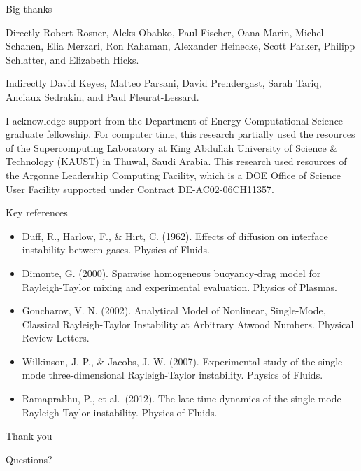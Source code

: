 \documentclass[12pt]{beamer}
\begin{document}
\begin{frame}{Big thanks}
\begin{block}{Directly}
Robert Rosner, Aleks Obabko, Paul Fischer, Oana Marin, Michel Schanen, Elia Merzari, Ron Rahaman, Alexander Heinecke, Scott Parker, Philipp Schlatter, and Elizabeth Hicks.
\end{block}

\begin{block}{Indirectly}
David Keyes, Matteo Parsani, David Prendergast, Sarah Tariq, Anciaux Sedrakin, and Paul Fleurat-Lessard.
\end{block}

{\scriptsize
I acknowledge support from the Department of Energy Computational Science graduate fellowship.
For computer time, this research partially used the resources of the
Supercomputing Laboratory at King Abdullah University of Science \& Technology
 (KAUST) in Thuwal, Saudi Arabia.
 This research used resources of the Argonne Leadership Computing Facility, which
 is a DOE Office of Science User Facility supported under Contract DE-AC02-06CH11357.
}
\end{frame}

\begin{frame}{Key references}

{\footnotesize
\begin{itemize}
  \item Duff, R., Harlow, F., \& Hirt, C. (1962). Effects of diffusion on interface instability between gases. Physics of Fluids. 
  \item Dimonte, G. (2000). Spanwise homogeneous buoyancy-drag model for Rayleigh-Taylor mixing and experimental evaluation. Physics of Plasmas.
  \item Goncharov, V. N. (2002). Analytical Model of Nonlinear, Single-Mode, Classical Rayleigh-Taylor Instability at Arbitrary Atwood Numbers. Physical Review Letters. 
  \item Wilkinson, J. P., \& Jacobs, J. W. (2007). Experimental study of the single-mode three-dimensional Rayleigh-Taylor instability. Physics of Fluids.
  \item Ramaprabhu, P., et al.\ (2012). The late-time dynamics of the single-mode Rayleigh-Taylor instability. Physics of Fluids.
\end{itemize}
}
\end{frame}

\begin{frame}{Thank you}

{\Huge Questions?}

\end{frame}
\end{document}
